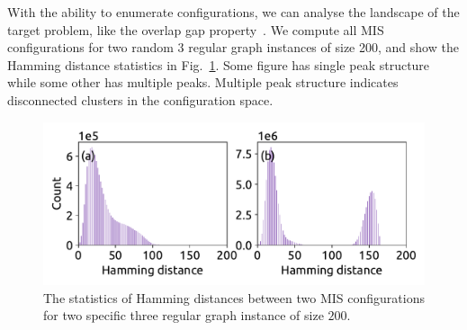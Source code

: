 \documentclass[onefignum, onetabnum]{siamart190516}
\newcommand{\<}{\langle}
\renewcommand{\>}{\rangle}
\newcommand{\Fig}[1]{Fig.~\ref{#1}}
\begin{document}
With the ability to enumerate configurations, we can analyse the landscape of the target problem, like the overlap gap property~\cite{Gamarnik2013, Gamarnik2019}.
We compute all MIS configurations for two random 3 regular graph instances of size 200, and show the Hamming distance statistics in \Fig{fig:hamming}.
Some figure has single peak structure while some other has multiple peaks. Multiple peak structure indicates disconnected clusters in the configuration space.
\begin{figure} 
    \centering
    \includegraphics[width=\textwidth, trim={0cm 0cm 0cm 0cm}, clip]{figures/fig3.pdf}
    \caption{The statistics of Hamming distances between two MIS configurations for two specific three regular graph instance of size $200$.}
    \label{fig:hamming}
\end{figure}
\end{document}
